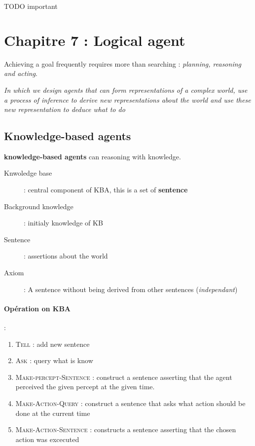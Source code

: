TODO important

\section{Chapitre 7 : Logical agent}
Achieving a goal frequently requires more than searching : \textit{planning,
reasoning and acting}.

\textit{In which we design agents that can form representations of a complex world, use a process of inference to derive new representations about the world and use these new representation to deduce what to do}

\subsection{Knowledge-based agents}

\textbf{knowledge-based agents} can reasoning with knowledge.

\begin{description}
    \item[Knwoledge base] : central component of KBA, this is a set of \textbf{sentence}
    \item[Background knowledge] : initialy knowledge of KB
    \item[Sentence] : assertions about the world
    \item[Axiom] : A sentence without being derived from other sentences (\textit{independant})
\end{description}

\paragraph{Opération on KBA} :
\begin{enumerate}
    \item \textsc{Tell} : add new sentence
    \item \textsc{Ask} : query what is know

    \item \textsc{Make-percept-Sentence} : construct a sentence asserting that the agent perceived
        the given percept at the given time.
    \item \textsc{Make-Action-Query} : construct a sentence that asks what action should be done at the current time
    \item \textsc{Make-Action-Sentence} : constructs a sentence asserting that the chosen action was excecuted
\end{enumerate}

